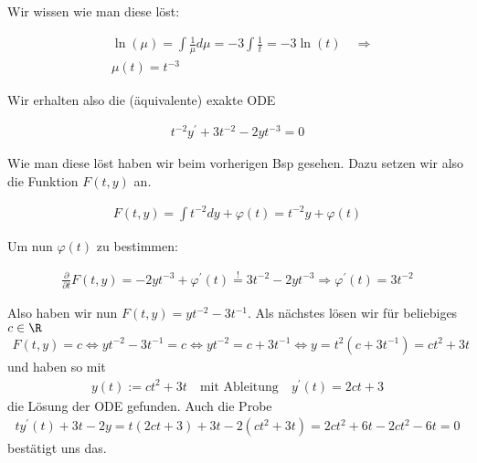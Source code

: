 \begin{solution}
Wir wissen wie man diese löst:

\begin{align*}
  &\ln(\mu) =\int \frac{1}{\mu} d\mu = -3 \int \frac{1}{t} = -3 \ln(t) \quad \Rightarrow \\
  &\mu(t) = t^{-3}
\end{align*}

Wir erhalten also die (äquivalente) exakte ODE

\begin{align*}
  t^{-2}y^\prime + 3t^{-2} -2yt^{-3} = 0
\end{align*}

Wie man diese löst haben wir beim vorherigen Bsp gesehen. Dazu setzen wir also die
Funktion $F(t,y)$ an.

\begin{align*}
  F(t,y) = \int t^{-2} dy + \varphi(t) = t^{-2} y + \varphi(t)
\end{align*}

Um nun $\varphi(t)$ zu bestimmen:

\begin{align*}
  \frac{\partial}{\partial t} F(t,y) = -2yt^{-3} + \varphi^\prime (t)
  \stackrel{!}{=} 3t^{-2} -2yt^{-3} \Rightarrow
  \varphi^\prime (t) = 3t^{-2}
\end{align*}

Also haben wir nun $F(t,y) = yt^{-2} - 3t^{-1}$.
Als nächstes lösen wir für beliebiges $c \in \R$
  \begin{align*}
    F(t, y) = c \Leftrightarrow yt^{-2} - 3t^{-1} = c \Leftrightarrow yt^{-2} = c + 3t^{-1} \Leftrightarrow y = t^2 (c + 3t^{-1}) = ct^2 + 3t
  \end{align*}
  und haben so mit
  \begin{align*}
    y(t) := ct^2 + 3t \quad \textrm{mit Ableitung} \quad y^\prime(t) = 2ct + 3
  \end{align*}
  die Lösung der ODE gefunden. Auch die Probe
  \begin{align*}
    ty^\prime(t) + 3t - 2y = t (2ct + 3) + 3t - 2(ct^2 + 3t) = 2ct^2 + 6t - 2ct^2 -6t = 0
  \end{align*}
  bestätigt uns das.
\end{solution}
